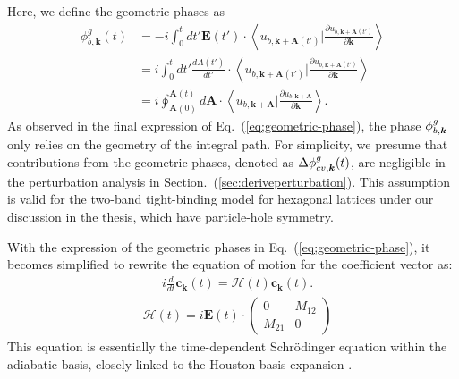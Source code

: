 Here, we define the geometric phases as
\begin{align}
	\phi^g_{b,\mathbf k}(t) & = -i\int^t_0 dt' \mathbf E(t')\cdot
	\left \langle u_{b,\mathbf k+\mathbf A(t')}\Big |\frac{\partial u_{b,\mathbf k+\mathbf A(t')}}{\partial
	\mathbf k} \right \rangle \nonumber                                                                                                                                                                           \\
	                        & =i\int^t_0 dt' \frac{dA(t')}{dt'}\cdot
	\left \langle u_{b,\mathbf k+\mathbf A(t')}\Big |\frac{\partial u_{b,\mathbf k+\mathbf A(t')}}{\partial \mathbf k} \right \rangle \nonumber                                                                   \\
	                        & = i \oint^{\mathbf A(t)}_{\mathbf A(0)} d\mathbf A \cdot \left \langle u_{b,\mathbf k+\mathbf A}\Big |\frac{\partial u_{b,\mathbf k+\mathbf A}}{\partial \mathbf k} \right \rangle.
	\label{eq;geometric-phase}
\end{align}
As observed in the final expression of Eq.~(\ref{eq;geometric-phase}), the phase $\phi^g_{b,\boldsymbol k}$ only relies on the geometry of the integral path. For simplicity, we presume that contributions from the geometric phases, denoted as $\Delta \phi^g_{cv,\boldsymbol k}(t)$, are negligible in the perturbation analysis in Section.~(\ref{sec:deriveperturbation}). This assumption is valid for the two-band tight-binding model for hexagonal lattices under our discussion in the thesis, which have particle-hole symmetry.

With the expression of the geometric phases in Eq.~(\ref{eq;geometric-phase}), it becomes simplified to rewrite the equation of motion for the coefficient vector as:
\begin{align}
	 & i\frac{d}{dt} \mathbf c_{\mathbf k}(t) = \mathcal{H}(t) \mathbf c_{\mathbf k}(t)
	.
	\label{eq:tdse-ad-basis_A}
\end{align}
\begin{align}
	 & \mathcal{H}(t)=
	i\mathbf E(t)\cdot \left(
	\begin{array}{cc}
			0      & M_{12} \\
			M_{21} & 0
		\end{array}
	\right)
\end{align}
This equation is essentially the time-dependent Schrödinger equation within the adiabatic basis, closely linked to the Houston basis expansion \cite{PhysRev.57.184,PhysRevB.33.5494}.
